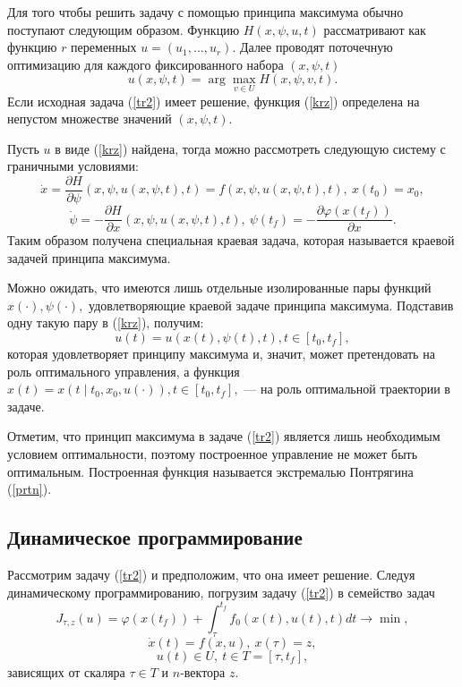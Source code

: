 Для того чтобы решить задачу с помощью принципа максимума обычно поступают следующим образом. Функцию $H(x, \psi ,u,t)$ рассматривают как функцию $r$  переменных $u = (u_1,...,u_r).$ Далее проводят поточечную оптимизацию для каждого фиксированного набора $(x, \psi ,t)$
\begin{equation}\label{krz}u(x, \psi ,t) = \arg \max_{v \in U} H(x, \psi , v, t).\end{equation}
Если исходная задача (\ref{tr2}) имеет решение, функция (\ref{krz}) определена на непустом множестве значений $(x, \psi , t).$

Пусть  $u$ в виде (\ref{krz}) найдена, тогда можно рассмотреть следующую систему с граничными условиями:
$$ \dot{x} =\frac{\partial{H}}{\partial{\psi}}(x, \psi , u(x, \psi , t), t) = f(x, \psi , u(x, \psi , t), t), \ x(t_0) = x_0,$$
$$ \dot{\psi } = - \frac{\partial{H}}{\partial{x}}(x, \psi , u(x, \psi , t), t), \  \psi (t_f) = -\frac{\partial{\varphi(x(t_f))}}{\partial{x}}.$$
Таким образом получена специальная краевая задача, которая называется краевой задачей принципа максимума.

Можно ожидать, что имеются лишь отдельные изолированные пары функций $x(\cdot), \psi (\cdot),$ удовлетворяющие краевой задаче принципа максимума. Подставив одну такую пару в (\ref{krz}), получим:
\begin{equation}\label{prtn}u(t) = u(x(t), \psi (t),t), t \in [t_0, t_f],\end{equation}
которая удовлетворяет принципу максимума и, значит, может претендовать на роль оптимального управления, а функция $x(t) = x(t\mid t_0,x_0,u(\cdot)), t\in [t_0, t_f],$ --- на роль оптимальной траектории в задаче.

Отметим, что принцип максимума в задаче (\ref{tr2}) является лишь необходимым условием оптимальности, поэтому построенное управление не может быть оптимальным. Построенная функция называется экстремалью Понтрягина (\ref{prtn}).
\subsection{Динамическое программирование}

Рассмотрим задачу (\ref{tr2}) и предположим, что она имеет решение. Следуя динамическому программированию\cite{Bellman}, погрузим задачу (\ref{tr2}) в семейство задач
$$ J_{\tau ,z}(u) = \varphi (x(t_f)) + \int^{t_{f}}_{\tau }
f_0(x(t),u(t),t)dt \rightarrow \min, $$
 \begin{equation}\label{dp1}\dot{x}(t)=f(x,u), \  x(\tau )=z,\end{equation}
$$u(t) \in U, \ t\in T = [\tau ,t_f],$$
зависящих от скаляра $\tau \in T$ и $n$-вектора $z.$

